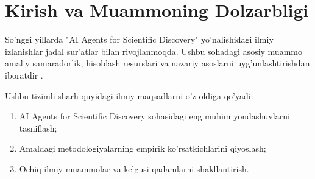 \section{Kirish va Muammoning Dolzarbligi}
So'nggi yillarda "AI Agents for Scientific Discovery" yo'nalishidagi ilmiy izlanishlar jadal sur'atlar bilan rivojlanmoqda. Ushbu sohadagi asosiy muammo amaliy samaradorlik, hisoblash resurslari va nazariy asoslarni uyg'unlashtirishdan iboratdir \cite{vaswani2017attention}.

Ushbu tizimli sharh quyidagi ilmiy maqsadlarni o'z oldiga qo'yadi:
\begin{enumerate}
  \item AI Agents for Scientific Discovery sohasidagi eng muhim yondashuvlarni tasniflash;
  \item Amaldagi metodologiyalarning empirik ko'rsatkichlarini qiyoslash;
  \item Ochiq ilmiy muammolar va kelgusi qadamlarni shakllantirish.
\end{enumerate}
